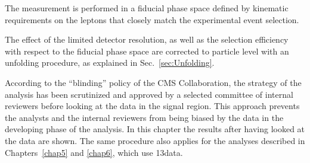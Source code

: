 The measurement is performed in a fiducial phase space defined by kinematic requirements on
the leptons that closely match the experimental event selection.

The effect of the limited detector resolution, as well as the
selection efficiency with respect to the fiducial phase space are corrected to
particle level with an unfolding procedure, as explained in Sec.~\ref{sec:Unfolding}.

According to the ``blinding'' policy of the CMS Collaboration, the strategy of the analysis has been scrutinized and approved by a selected committee of internal reviewers before looking at the data in the signal region. This approach prevents the analysts and the internal reviewers from being biased by the data in the developing phase of the analysis. In this chapter the results after having looked at the data are shown. The same procedure also applies for the analyses described in Chapters~\ref{chap5} and \ref{chap6}, which use 13\TeV data.








\clearpage

